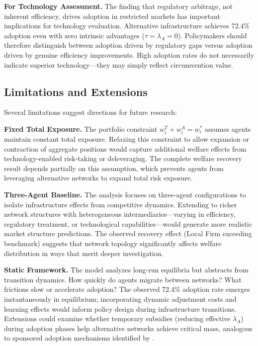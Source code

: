 \documentclass[12pt]{article}
\begin{document}
\textbf{For Technology Assessment.} The finding that regulatory arbitrage, not inherent efficiency, drives adoption in restricted markets has important implications for technology evaluation. Alternative infrastructure achieves 72.4\% adoption even with zero intrinsic advantages ($\tau = \lambda_A = 0$). Policymakers should therefore distinguish between adoption driven by regulatory gaps versus adoption driven by genuine efficiency improvements. High adoption rates do not necessarily indicate superior technology---they may simply reflect circumvention value.

\subsection{Limitations and Extensions}

Several limitations suggest directions for future research:

\textbf{Fixed Total Exposure.} The portfolio constraint $w_i^T + w_i^A = w_i^*$ assumes agents maintain constant total exposure. Relaxing this constraint to allow expansion or contraction of aggregate positions would capture additional welfare effects from technology-enabled risk-taking or deleveraging. The complete welfare recovery result depends partially on this assumption, which prevents agents from leveraging alternative networks to expand total risk exposure.

\textbf{Three-Agent Baseline.} The analysis focuses on three-agent configurations to isolate infrastructure effects from competitive dynamics. Extending to richer network structures with heterogeneous intermediaries---varying in efficiency, regulatory treatment, or technological capabilities---would generate more realistic market structure predictions. The observed recovery effect (Local Firm exceeding benchmark) suggests that network topology significantly affects welfare distribution in ways that merit deeper investigation.

\textbf{Static Framework.} The model analyzes long-run equilibria but abstracts from transition dynamics. How quickly do agents migrate between networks? What frictions slow or accelerate adoption? The observed 72.4\% adoption rate emerges instantaneously in equilibrium; incorporating dynamic adjustment costs and learning effects would inform policy design during infrastructure transitions. Extensions could examine whether temporary subsidies (reducing effective $\lambda_A$) during adoption phases help alternative networks achieve critical mass, analogous to sponsored adoption mechanisms identified by \citet{katz_network_1985}.
\end{document}
